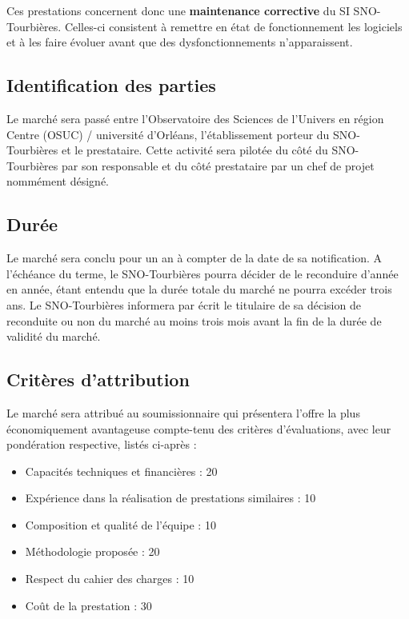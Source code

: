 \documentclass[]{article}
\newcommand{\SNOT}{{SNO-Tourbières}}
\begin{document}
Ces prestations concernent donc une \textbf{maintenance corrective} du SI \SNOT. Celles-ci consistent à remettre en état de fonctionnement les logiciels et à les faire évoluer avant que des dysfonctionnements n'apparaissent.

\subsection{Identification des parties}

Le marché sera passé entre l'Observatoire des Sciences de l'Univers en région Centre (OSUC) / université d'Orléans, l'établissement porteur du \SNOT{} et le prestataire. Cette activité sera pilotée du côté du \SNOT{} par son responsable et du côté prestataire par un chef de projet nommément désigné.

\subsection{Durée}

Le marché sera conclu pour un an à compter de la date de sa notification. A l'échéance du terme, le \SNOT{} pourra décider de le reconduire d'année en année, étant entendu que la durée totale du marché ne pourra excéder trois ans. Le \SNOT{} informera par écrit le titulaire de sa décision de reconduite ou non du marché au moins trois mois avant la fin de la durée de validité du marché.

\subsection{Critères d’attribution}

Le marché sera attribué au soumissionnaire qui présentera l'offre la plus économiquement avantageuse compte-tenu des critères d’évaluations, avec leur pondération respective, listés ci-après :

\begin{itemize}
	\item Capacités techniques et financières : 20
	\item Expérience dans la réalisation de prestations similaires : 10
	\item Composition et qualité de l’équipe : 10
	\item Méthodologie proposée : 20
	\item Respect du cahier des charges : 10
	\item Coût de la prestation : 30 
\end{itemize}
\end{document}
